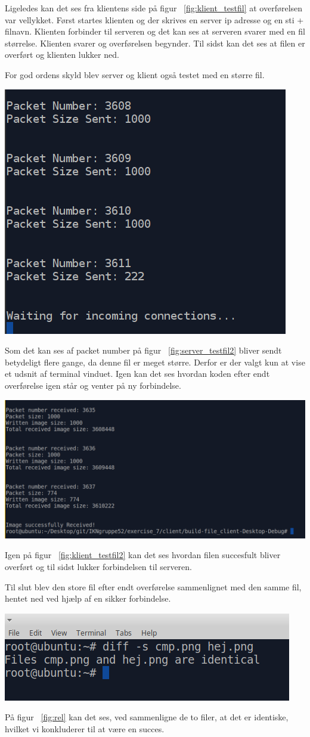 \documentclass[12pt,fleqn,a4paper]{report}
\begin{document}
Ligeledes kan det ses fra klientens side på figur ~\ref{fig:klient_testfil} at overførelsen var vellykket. 
Først startes klienten og der skrives en server ip adresse og en sti + filnavn. 
Klienten forbinder til serveren og det kan ses at serveren svarer med en fil størrelse. Klienten svarer og overførelsen begynder.
Til sidst kan det ses at filen er overført og klienten lukker ned.


For god ordens skyld blev server og klient også testet med en større fil. 
\begin{center}
	\includegraphics[width=0.3 \textwidth]{server_storfil2.png}
	\label{fig:server_testfil2}
\end{center}

Som det kan ses af packet number på figur  ~\ref{fig:server_testfil2} bliver sendt betydeligt flere gange, da denne fil er meget større. Derfor er der valgt kun at vise et udsnit af terminal vinduet. Igen kan det ses hvordan koden efter endt overførelse igen står og venter på ny forbindelse.

\begin{center}
	\includegraphics[width=0.6 \textwidth]{klient_stortestfil2.png}
	\label{fig:klient_testfil2}
\end{center}

Igen på figur ~\ref{fig:klient_testfil2} kan det ses hvordan filen succesfult bliver overført og til sidst lukker forbindelsen til serveren.
\newpage

Til slut blev den store fil efter endt overførelse sammenlignet med den samme fil, hentet ned ved hjælp af en sikker forbindelse. 
\begin{center}
	\includegraphics[width=0.6 \textwidth]{resultat_er_de_ens.png}
	\label{fig:rel}
\end{center}

På figur ~\ref{fig:rel} kan det ses, ved sammenligne de to filer, at det er identiske, hvilket vi konkluderer til at være en succes.
\end{document}
